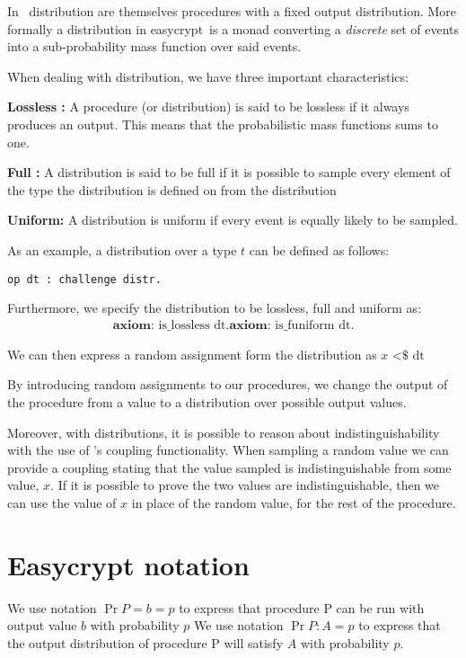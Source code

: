 In \easycrypt\ distribution are themselves procedures with a fixed output
distribution. More formally a distribution in easycrypt\ is a monad converting a
\textit{discrete} set of events into a sub-probability mass function over said events.

When dealing with distribution, we have three important characteristics:

\noindent \textbf{Lossless :} A procedure (or distribution) is said to be
lossless if it always produces an output. This means that the
probabilistic mass functions sums to one.

\noindent \textbf{Full :} A distribution is said to be full if it is
possible to sample every element of the type the distribution is defined on from
the distribution

\noindent \textbf{Uniform: } A distribution is uniform if every event is equally
likely to be sampled.

As an example, a distribution over a type $t$ can be defined as follows:
\begin{lstlisting}[frame=none]
op dt : challenge distr.
\end{lstlisting}
Furthermore, we specify the distribution to be lossless, full and uniform as:
\begin{gather*}
  \textbf{axiom: } \text{is\_lossless dt}.
  \textbf{axiom: } \text{is\_funiform dt}.
\end{gather*}

We can then express a random assignment form the distribution as $x \text{ <\$} \text{ dt}$


By introducing random assignments to our procedures, we change
the output of the procedure from a value to a distribution over possible output values.

Moreover, with distributions, it is possible to reason about indistinguishability
with the use of \easycrypt's coupling functionality. When sampling a random
value we can provide a coupling stating that the value sampled is
indistinguishable from some value, $x$. If it is possible to prove the two
values are indistinguishable, then we can use the value of $x$ in place of the
random value, for the rest of the procedure.

\section{Easycrypt notation}
\label{sec:label}

We use notation $\Pr{P = b} = p$ to express that procedure P can be run with
output value $b$ with probability $p$
We use notation $\Pr{P : A} = p$ to express that the output distribution of
procedure P will satisfy $A$ with probability $p$.

